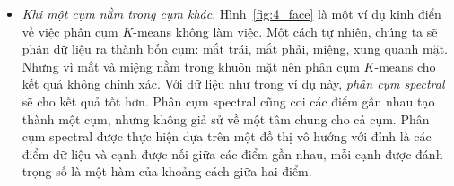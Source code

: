 \begin{itemize}
    \item \textit{Khi một cụm nằm trong cụm khác}.
    Hình~\ref{fig:4_face} là một ví dụ kinh điển về việc phân cụm $K$-means
    không làm việc. Một cách tự nhiên, chúng ta sẽ phân dữ liệu ra thành bốn
    cụm: mắt trái, mắt phải, miệng, xung quanh mặt. Nhưng vì mắt và miệng nằm
    trong khuôn mặt nên phân cụm $K$-means cho kết quả không chính xác. Với dữ
    liệu như trong ví dụ này, \textit{phân cụm
    spectral}~\cite{von2007tutorial,ng2002spectral} sẽ cho kết quả tốt hơn. Phân
    cụm spectral cũng coi các điểm gần nhau tạo thành một cụm, nhưng không giả
    sử về một tâm chung cho cả cụm. Phân cụm spectral được thực hiện dựa trên
    một đồ thị vô hướng với đỉnh là các điểm dữ liệu và cạnh được nối giữa các
    điểm gần nhau, mỗi cạnh được đánh trọng số là một hàm của khoảng cách giữa
    hai điểm.
  

\end{itemize}


